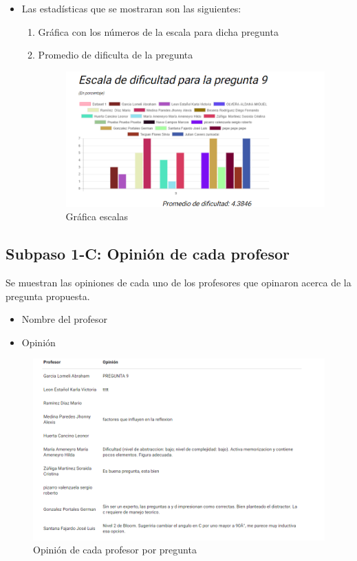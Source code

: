 \begin{itemize}
	\item  Las estadísticas que se mostraran son las siguientes:
	\begin{enumerate}
		
		\item Gráfica con los números de la escala para dicha pregunta
		\item Promedio de dificulta de la pregunta
		\begin{figure}[hbtp]
	\includegraphics[scale=0.7]{images/Interfaz/IUGS15_recursosAnos.PNG}
	\caption{Gráfica escalas}
	\end{figure}
	


	\end{enumerate}
	
\end{itemize}
\subsection{Subpaso 1-C: Opinión de cada profesor}
Se muestran las opiniones de cada uno de los profesores que opinaron acerca 
de la pregunta propuesta.
\begin{itemize}
	\item Nombre del profesor
	\item Opinión 
\end{itemize}

\begin{figure}[hbtp]
	\includegraphics[scale=0.5]{images/Interfaz/IUGS15_opinionPorPregunta.PNG}
	\caption{Opinión de cada profesor por pregunta}
	\end{figure}